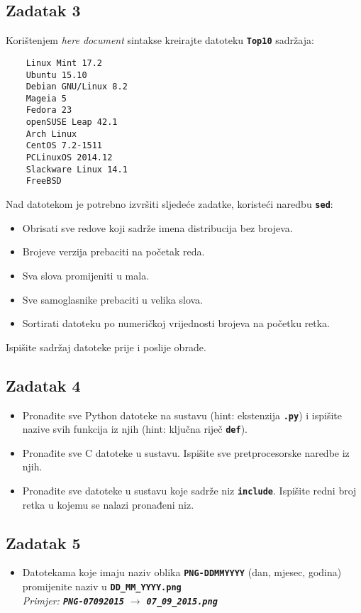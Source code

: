 \documentclass[12pt,a4paper]{article}
\newcommand{\shell}[1]{\texttt{\textbf{#1}}}
\begin{document}
	\subsection*{Zadatak 3}
	Korištenjem \textit{here document} sintakse kreirajte datoteku \shell{Top10} sadržaja:
	\begin{verbatim}
	Linux Mint 17.2
	Ubuntu 15.10
	Debian GNU/Linux 8.2
	Mageia 5
	Fedora 23
	openSUSE Leap 42.1
	Arch Linux
	CentOS 7.2-1511
	PCLinuxOS 2014.12
	Slackware Linux 14.1
	FreeBSD
	\end{verbatim}
	Nad datotekom je potrebno izvršiti sljedeće zadatke, koristeći naredbu \shell{sed}:
	\begin{itemize}
		\item Obrisati sve redove koji sadrže imena distribucija bez brojeva.
		\item Brojeve verzija prebaciti na početak reda.
		\item Sva slova promijeniti u mala.
		\item Sve samoglasnike prebaciti u velika slova.
		\item Sortirati datoteku po numeričkoj vrijednosti brojeva na početku retka.
	\end{itemize}
	Ispišite sadržaj datoteke prije i poslije obrade.

	\subsection*{Zadatak 4}
	\begin{itemize}
		\item Pronađite sve Python datoteke na sustavu (hint: ekstenzija \shell{.py}) i ispišite nazive svih funkcija iz njih (hint: ključna riječ \shell{def}).
		\item Pronađite sve C datoteke u sustavu. Ispišite sve pretprocesorske naredbe iz njih.
		\item Pronađite sve datoteke u sustavu koje sadrže niz \shell{include}. Ispišite redni broj retka u kojemu se nalazi pronađeni niz.
	\end{itemize}

	\subsection*{Zadatak 5}
	\begin{itemize}
    \item Datotekama koje imaju naziv oblika \shell{PNG-DDMMYYYY} (dan, mjesec, godina) promijenite naziv u \shell{DD\_MM\_YYYY.png} \\ \textit{Primjer: \shell{PNG-07092015} $\longrightarrow$ \shell{07\_09\_2015.png}}
	\end{itemize}
\end{document}
